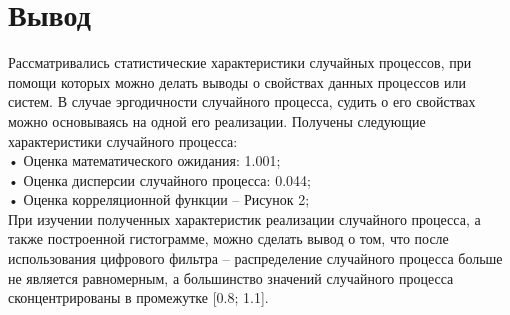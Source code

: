 \documentclass[12pt]{article}
\begin{document}
\section{Вывод}
Рассматривались статистические характеристики случайных процессов, при помощи которых можно делать выводы о свойствах данных процессов или систем. В случае эргодичности случайного процесса, судить о его свойствах можно основываясь на одной его реализации. 
Получены следующие характеристики случайного процесса:\\
    • Оценка математического ожидания: 1.001;\\
    • Оценка дисперсии случайного процесса: 0.044;\\
    • Оценка корреляционной функции – Рисунок 2;\\
При изучении полученных характеристик реализации случайного процесса, а также построенной гистограмме, можно сделать вывод о том, что после использования цифрового фильтра – распределение случайного процесса больше не является равномерным, а большинство значений случайного процесса сконцентрированы в промежутке [0.8; 1.1].
\end{document}
